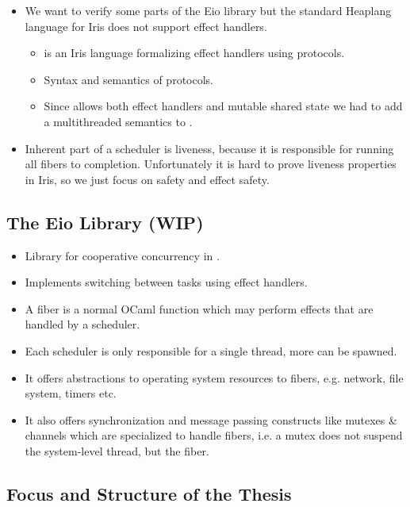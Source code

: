 \begin{itemize}
\begin{itemize}
        \end{itemize}
  \item We want to verify some parts of the Eio library but the standard Heaplang language for Iris does not support effect handlers.
        \begin{itemize}
          \item \hazel{} is an Iris language formalizing effect handlers using protocols.
          \item Syntax and semantics of protocols.
          \item Since \ocf{} allows both effect handlers and mutable shared state we had to add a multithreaded semantics to \hazel{}.
        \end{itemize}
  \item Inherent part of a scheduler is liveness, because it is responsible for running all fibers to completion. Unfortunately it is hard to prove liveness properties in Iris, so we just focus on safety and effect safety.
\end{itemize}

\subsection{The Eio Library (WIP)}
\label{sec:intro-eio}

\begin{itemize}
  \item Library for cooperative concurrency in \ocf{}.
  \item Implements switching between tasks using effect handlers.
  \item A fiber is a normal OCaml function which may perform effects that are handled by a scheduler.
  \item Each scheduler is only responsible for a single thread, more can be spawned.
  \item It offers abstractions to operating system resources to fibers, e.g. network, file system, timers etc.
  \item It also offers synchronization and message passing constructs like mutexes \& channels which are specialized to handle fibers, i.e. a mutex does not suspend the system-level thread, but the fiber.
\end{itemize}

\subsection{Focus and Structure of the Thesis}
\label{sec:intro-structure}

